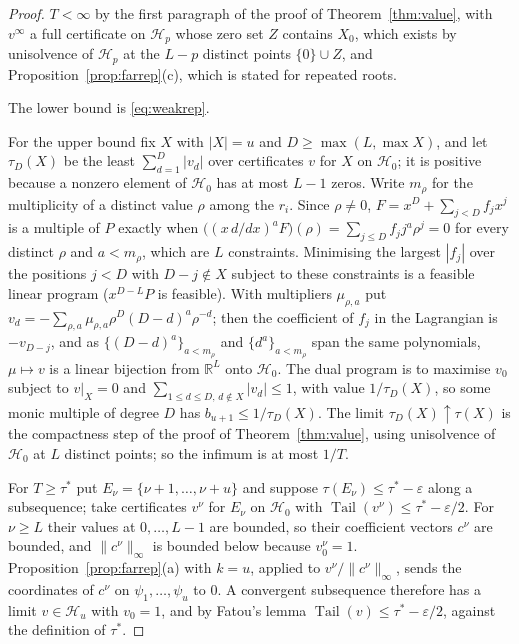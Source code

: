 \documentclass[11pt]{article}
\theoremstyle{definition}
\theoremstyle{plain}
\newcommand{\R}{\mathbb R}
\DeclareMathOperator{\Tail}{Tail}
\begin{document}
\begin{proof}
$T<\infty$ by the first paragraph of the proof of Theorem~\ref{thm:value},
with $v^\infty$ a full certificate on $\mathcal H_p$ whose zero set
$Z$ contains $X_0$, which exists by unisolvence of $\mathcal H_p$ at the
$L-p$ distinct points $\{0\}\cup Z$, and Proposition~\ref{prop:farrep}(c),
which is stated for repeated roots.

The lower bound is \eqref{eq:weakrep}.

For the upper bound fix $X$ with $|X|=u$ and $D\ge\max(L,\max X)$, and let
$\tau_D(X)$ be the least $\sum_{d=1}^D|v_d|$ over certificates $v$ for $X$
on $\mathcal H_0$; it is positive because a nonzero element of
$\mathcal H_0$ has at most $L-1$ zeros.  Write $m_\rho$ for the multiplicity
of a distinct value $\rho$ among the $r_i$.  Since $\rho\ne0$,
$F=x^D+\sum_{j<D}f_jx^j$ is a multiple of $P$ exactly when
$\bigl((x\,d/dx)^aF\bigr)(\rho)=\sum_{j\le D}f_jj^a\rho^j=0$ for every
distinct $\rho$ and $a<m_\rho$, which are $L$ constraints.  Minimising the
largest $|f_j|$ over the positions $j<D$ with $D-j\notin X$ subject to these
constraints is a feasible linear program ($x^{D-L}P$ is feasible).  With
multipliers $\mu_{\rho,a}$ put
$v_d=-\sum_{\rho,a}\mu_{\rho,a}\rho^D(D-d)^a\rho^{-d}$; then the coefficient
of $f_j$ in the Lagrangian is $-v_{D-j}$, and as $\{(D-d)^a\}_{a<m_\rho}$ and
$\{d^a\}_{a<m_\rho}$ span the same polynomials, $\mu\mapsto v$ is a linear
bijection from $\R^L$ onto $\mathcal H_0$.  The dual program is to maximise $v_0$
subject to $v|_X=0$ and $\sum_{1\le d\le D,\,d\notin X}|v_d|\le1$, with value
$1/\tau_D(X)$, so some monic multiple of degree $D$ has
$b_{u+1}\le1/\tau_D(X)$.  The limit $\tau_D(X)\uparrow\tau(X)$ is the
compactness step of the proof of Theorem~\ref{thm:value}, using unisolvence
of $\mathcal H_0$ at $L$ distinct points; so the infimum is at most $1/T$.

For $T\ge\tau^*$ put $E_\nu=\{\nu+1,\ldots,\nu+u\}$ and suppose
$\tau(E_\nu)\le\tau^*-\varepsilon$ along a subsequence; take certificates
$v^\nu$ for $E_\nu$ on $\mathcal H_0$ with
$\Tail(v^\nu)\le\tau^*-\varepsilon/2$.  For $\nu\ge L$ their values at
$0,\ldots,L-1$ are bounded, so their coefficient vectors $c^\nu$ are bounded,
and $\|c^\nu\|_\infty$ is bounded below because $v^\nu_0=1$.
Proposition~\ref{prop:farrep}(a) with $k=u$, applied to
$v^\nu/\|c^\nu\|_\infty$, sends the coordinates of $c^\nu$ on
$\psi_1,\ldots,\psi_u$ to $0$.  A convergent subsequence therefore has a
limit $v\in\mathcal H_u$ with $v_0=1$, and by Fatou's lemma
$\Tail(v)\le\tau^*-\varepsilon/2$, against the definition of $\tau^*$.
\end{proof}
\end{document}
